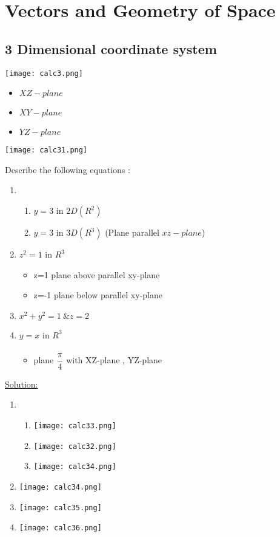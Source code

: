 \chapter{Vectors and Geometry of Space}
\section{3 Dimensional coordinate system}
\texttt{[image: calc3.png]}\\
\begin{itemize}
    \item $XZ-plane$
    \item $XY-plane$
    \item $YZ-plane$
\end{itemize}
\texttt{[image: calc31.png]}\\
\begin{example}
Describe the following equations :
\begin{enumerate}
\item
\begin{enumerate}
    \item  $y=3$ in $2D(R^2)$
    \item $y=3$ in $3D(R^3)$ (Plane parallel $xz-plane$)
\end{enumerate}
    \item $z^2=1 $ in $R^3$ \begin{itemize}
        \item z=1 plane above parallel xy-plane
                \item z=-1 plane below parallel xy-plane
    \end{itemize}
\item $x^2+y^2=1 ~ \& z=2$
\item $y=x$ in $R^3$
\begin{itemize}
    \item plane $\cfrac{\pi}{4}$ with XZ-plane , YZ-plane
\end{itemize}
\end{enumerate}
{\color{smalt(darkpowderblue)}\underline {Solution:}}\\
\begin{enumerate}
    \item 
    \begin{enumerate}
     \item \texttt{[image: calc33.png]}\\
    \item \texttt{[image: calc32.png]}\\
        \item \texttt{[image: calc34.png]}\\
\end{enumerate}
           \item \texttt{[image: calc34.png]}\\
    \item \texttt{[image: calc35.png]}\\
    \item \texttt{[image: calc36.png]}\\
\end{enumerate}
\end{example}
